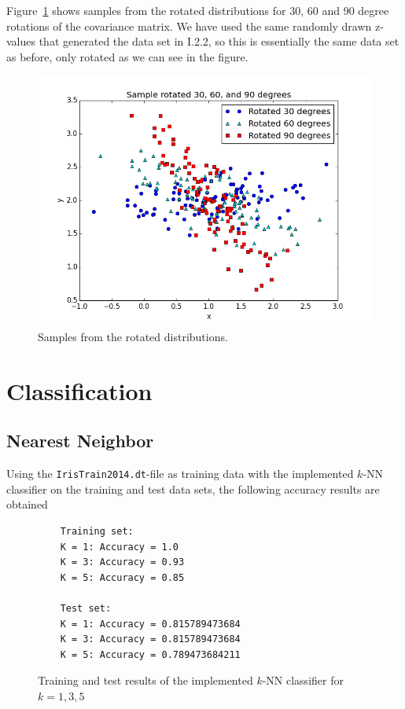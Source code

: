 \documentclass[a4paper]{article}
\begin{document}
Figure~\ref{fig:samples_rotated} shows samples from the rotated distributions for 30, 60 and 90 degree rotations of the covariance matrix. We have used the same randomly drawn z-values that generated the data set in I.2.2, so this is essentially the same data set as before, only rotated as we can see in the figure.


\begin{figure}[H]
  \centering
  \includegraphics[width=.7\linewidth]{figures/samples_rotated.png}
  \caption{Samples from the rotated distributions.}
  \label{fig:samples_rotated}
\end{figure}

\section{Classification}

\subsection{Nearest Neighbor}
Using the \texttt{IrisTrain2014.dt}-file as training data with the implemented $k$-NN classifier on the training and test data sets, the following accuracy results are obtained
\begin{figure}[H]
	\begin{lstlisting}
	Training set:
	K = 1: Accuracy = 1.0
	K = 3: Accuracy = 0.93
	K = 5: Accuracy = 0.85

	Test set:
	K = 1: Accuracy = 0.815789473684
	K = 3: Accuracy = 0.815789473684
	K = 5: Accuracy = 0.789473684211
	\end{lstlisting}
	\caption{Training and test results of the implemented $k$-NN classifier for $k=1,3,5$}
	\label{fig:k-nn_results}
\end{figure}
\end{document}
